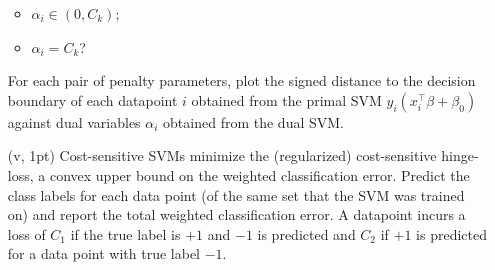 \documentclass{article}
\theoremstyle{remark}
\theoremstyle{definition}
\begin{document}
\begin{enumerate}
\begin{itemize}
            \item $\alpha_i \in (0, C_k)$;
            \item $\alpha_i = C_k$?
        \end{itemize}
        For each pair of penalty parameters, plot the signed distance to the
        decision boundary of each datapoint $i$ obtained from the primal SVM
        $y_i(x_i^\top \beta + \beta_0)$ against dual variables $\alpha_i$
        obtained from the dual SVM.
    \item[(v, 1pt)]
        Cost-sensitive SVMs minimize the (regularized) cost-sensitive
        hinge-loss, a convex upper bound on the weighted classification error.
        Predict the class labels for each data point (of the same set that the
        SVM was trained on) and report the total weighted classification error.
        A datapoint incurs a loss of $C_1$ if the true label is $+1$ and $-1$
        is predicted and $C_2$ if $+1$ is predicted for a data point with true
        label $-1$.
\end{enumerate}
\end{document}
